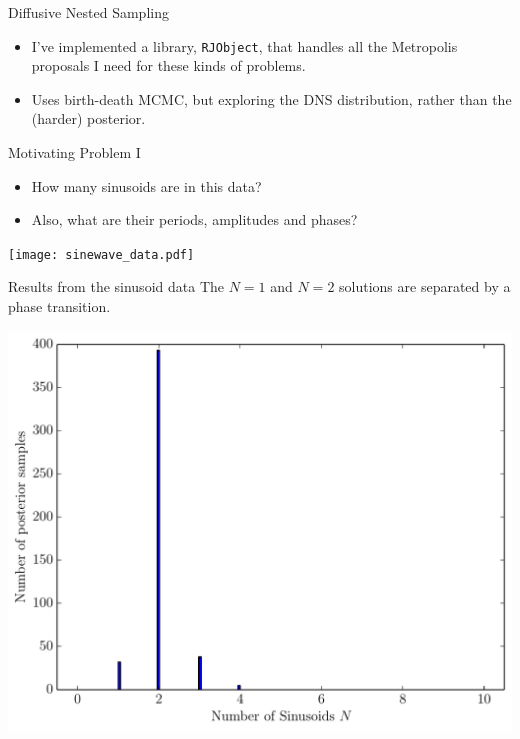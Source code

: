 \begin{frame}[t]{Diffusive Nested Sampling}
\begin{itemize}
\setlength{\itemsep}{20pt}
\item I've implemented a library, {\tt RJObject}, that handles all the
Metropolis proposals I need for these kinds of problems.
\item Uses birth-death MCMC, but exploring the DNS distribution, rather than
the (harder) posterior.
\end{itemize}
\end{frame}

\begin{frame}[t]{Motivating Problem I}
\begin{itemize}
\item How many sinusoids are in this data?
\item Also, what are their periods, amplitudes and phases?
\end{itemize}
\begin{center}
\texttt{[image: sinewave\_data.pdf]}
\end{center}
\end{frame}

\begin{frame}[t]{Results from the sinusoid data}
The $N=1$ and $N=2$ solutions are separated by a phase transition.
\begin{center}
\includegraphics[scale=0.45]{../Paper/N_result.pdf}
\end{center}
\end{frame}

